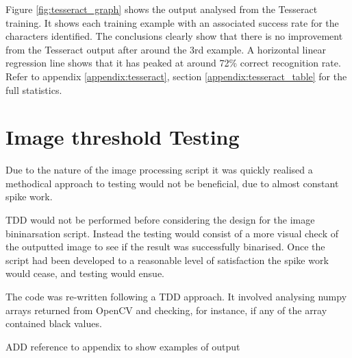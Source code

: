 Figure \ref{fig:tesseract_graph} shows the output analysed from the Tesseract training. It shows each training example with an associated success rate for the characters identified. The conclusions clearly show that there is no improvement from the Tesseract output after around the 3rd example. A horizontal linear regression line shows that it has peaked at around 72\% correct recognition rate. Refer to appendix \ref{appendix:tesseract}, section \ref{appendix:tesseract_table} for the full statistics.

\section{Image threshold Testing}
Due to the nature of the image processing script it was quickly realised a methodical approach to testing would not be beneficial, due to almost constant spike work.

TDD would not be performed before considering the design for the image bininarsation script. Instead the testing would consist of a more visual check of the outputted image to see if the result was successfully binarised. Once the script had been developed to a reasonable level of satisfaction the spike work would cease, and testing would ensue.

The code was re-written following a TDD approach. It involved analysing numpy arrays returned from OpenCV and checking, for instance, if any of the array contained black values.

ADD reference to appendix to show examples of output
